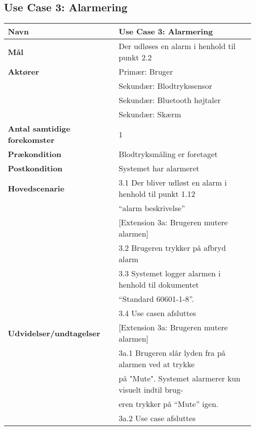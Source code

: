 \vspace{1 cm}
\subsection{Use Case 3: Alarmering}
\begin{table}[h!]
	\begin{tabular}{l|l}
		\rowcolor[HTML]{A9D9F9} 
		\textbf{Navn} & Use Case 3: Alarmering \\ \hline
		\textbf{Mål} & Der udløses en alarm i henhold til punkt 2.2 \\ \hline
		\textbf{Aktører} & Primær: Bruger \\
		\textbf{} & Sekundær: Blodtrykssensor \\
		\textbf{} & Sekundær: Bluetooth højtaler \\
		\textbf{} & Sekundær: Skærm \\ \hline
		\rowcolor[HTML]{A9D9F9} 
		\textbf{Antal samtidige forekomster} & 1 \\ \hline
		\textbf{Prækondition} & Blodtryksmåling er foretaget \\ \hline
		\rowcolor[HTML]{A9D9F9} 
		\textbf{Postkondition} & Systemet har alarmeret \\ \hline
		\textbf{Hovedscenarie} & 3.1 Der bliver udløst en alarm i henhold til punkt 1.12 \\
		\textbf{} & “alarm beskrivelse” \\
		\textbf{} & {[}Extension 3a: Brugeren mutere alarmen{]} \\
		\textbf{} & 3.2 Brugeren trykker på afbryd alarm \\
		\textbf{} & 3.3 Systemet logger alarmen i henhold til dokumentet \\
		\textbf{} & “Standard 60601-1-8”. \\
		\textbf{} & 3.4 Use casen afsluttes \\ \hline
		\rowcolor[HTML]{A9D9F9} 
		\textbf{Udvidelser/undtagelser} & {[}Extension 3a: Brugeren mutere alarmen{]} \\
		\rowcolor[HTML]{A9D9F9} 
		& 3a.1 Brugeren slår lyden fra på alarmen ved at trykke\\
		\rowcolor[HTML]{A9D9F9} 
		& på "Mute". Systemet alarmerer kun visuelt indtil brug- \\
		\rowcolor[HTML]{A9D9F9} 
		& eren trykker på “Mute” igen. \\
		\rowcolor[HTML]{A9D9F9} 
		& 3a.2 Use case afsluttes
	\end{tabular}
\end{table}